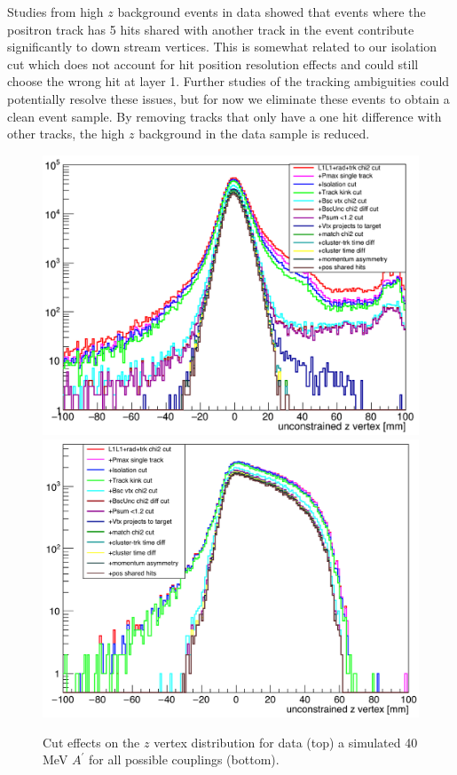 \documentclass[twocolumn, showpacs, preprintnumbers,prd, superscriptaddress]{revtex4-1}
\begin{document}
Studies from high $z$ background events in data showed that events where the positron track has 5 hits shared with another track in the event contribute significantly to down stream vertices. This is somewhat related to our isolation cut which does not account for hit position resolution effects and could still choose the wrong hit at layer 1. Further studies of the tracking ambiguities could potentially resolve these issues, but for now we eliminate these events to obtain a clean event sample. By removing tracks that only have a one hit difference with other tracks, the high $z$ background in the data sample is reduced.

        \begin{figure}[th]
            \centering
            \includegraphics[width=.9\linewidth]{figs/L1L1_zvtx.png}
            \includegraphics[width=.9\linewidth]{figs/ap40mev_zvtxCuts.png}
            \caption{
                Cut effects on the $z$ vertex distribution for data (top) a simulated 40 MeV $A^{\prime}$ for all possible couplings (bottom).}
            \label{fig:cutflow}
        \end{figure}
\end{document}
